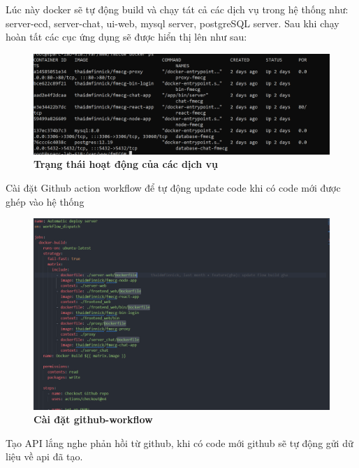 \begin{itemize}
  Lúc này docker sẽ tự động build và chạy tát cả các dịch vụ trong hệ thống như: server-ecd, server-chat, ui-web, mysql server, postgreSQL server. Sau khi chạy hoàn tất các cục ứng dụng sẽ được hiển thị lên như sau:

  \begin{figure}[H]
    \centering
    \includegraphics[scale=0.5]{Images/server/deploy/docker-container.png}
    \caption[Trạng thái hoạt động của các dịch vụ]{\bfseries \fontsize{12pt}{0pt}
    \selectfont Trạng thái hoạt động của các dịch vụ}
    \label{docker-container-status} %
  \end{figure}

  Cài đặt Github action workflow để tự động update code khi có code mới được ghép vào hệ thống 
 
  \begin{figure}[H]
    \centering
    \includegraphics[scale=0.5]{Images/server/deploy/github-workflow.png}
    \caption[Cài đặt github-workflow]{\bfseries \fontsize{12pt}{0pt}
    \selectfont Cài đặt github-workflow}
    \label{github-workflow} %
  \end{figure}

  Tạo API lắng nghe phản hồi từ github, khi có code mới github sẽ tự động gửi dữ liệu về api đã tạo.


\end{itemize}
